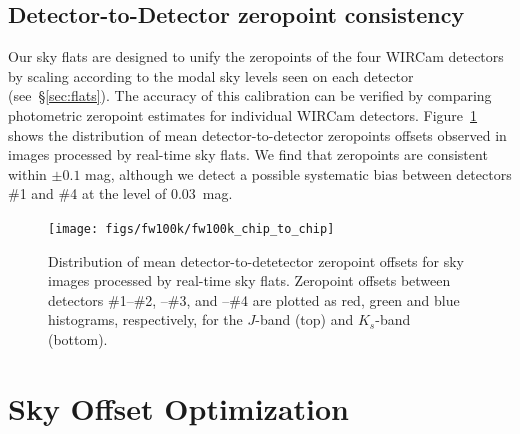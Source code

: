 \documentclass[iop]{emulateapj}
\newcommand{\mycomment}[1]{\textcolor{OliveGreen}{\textit{#1}}} %
\newcommand{\Fig}[1]{Fig.~\ref{fig:#1}}  %
\newcommand{\Sec}[1]{\S\ref{sec:#1}}  %
\begin{document}
\subsection{Detector-to-Detector zeropoint consistency}
\label{sec:detector_zp}

Our sky flats are designed to unify the zeropoints of the four WIRCam detectors by scaling according to the modal sky levels seen on each detector (see~\Sec{flats}).
The accuracy of this calibration can be verified by comparing photometric zeropoint estimates for individual WIRCam detectors.
Figure~\ref{fig:fw100k_chip_to_chip} shows the distribution of mean detector-to-detector zeropoints offsets observed in images processed by real-time sky flats. We find that zeropoints are consistent within $\pm 0.1$ mag, although we detect a possible systematic bias between detectors \#1 and \#4 at the level of $0.03$~mag.

\begin{figure}[t]
\centering
\texttt{[image: figs/fw100k/fw100k\_chip\_to\_chip]}
\caption{Distribution of mean detector-to-detetector zeropoint offsets for sky images processed by real-time sky flats. Zeropoint offsets between detectors \#1--\#2, --\#3, and --\#4 are plotted as
red, green and blue histograms, respectively, for the $J$-band (top) and $K_s$-band (bottom).}
\label{fig:fw100k_chip_to_chip}
\end{figure}

\section{Sky Offset Optimization}
\label{sec:scalar}
\end{document}
